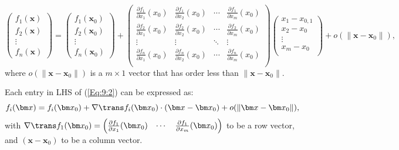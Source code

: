 \begin{equation}\label{Eq:9:2}
\begin{pmatrix}
f_1(\bm x)\\
f_2(\bm x)\\
\vdots\\
f_n(\bm x)
\end{pmatrix}=
\begin{pmatrix}
f_1(\bm x_0)\\
f_2(\bm x_0)\\
\vdots\\
f_n(\bm x_0)
\end{pmatrix}
+
\begin{pmatrix}
\frac{\partial f_1}{\partial x_1}(x_0)&\frac{\partial f_1}{\partial x_2}(x_0)&\cdots&\frac{\partial f_1}{\partial x_m}(x_0)\\
\frac{\partial f_2}{\partial x_1}(x_0)&\frac{\partial f_2}{\partial x_2}(x_0)&\cdots&\frac{\partial f_2}{\partial x_m}(x_0)\\
\vdots&\vdots&\ddots&\vdots\\
\frac{\partial f_n}{\partial x_1}(x_0)&\frac{\partial f_n}{\partial x_2}(x_0)&\cdots&\frac{\partial f_n}{\partial x_m}(x_0)\\
\end{pmatrix}
\begin{pmatrix}
x_1- x_{0,1}\\
x_2- x_0\\
\vdots\\
x_m- x_0\\
\end{pmatrix}
+o(\|\bm x-\bm x_0\|),
\end{equation}
where $o(\|\bm x-\bm x_0\|)$ is a $m\times 1$ vector that has order less than $\|\bm x-\bm x_0\|$.

Each entry in LHS of (\ref{Eq:9:2}) can be expressed as:
\[
f_i(\bm x)=f_i(\bm x_0)+\nabla\trans f_i(\bm x_0)\cdot (\bm x-\bm x_0)+o(\|\bm x-\bm x_0\|),
\]
with $\nabla\trans f_1(\bm x_0) = \begin{pmatrix}
\frac{\partial f_1}{\partial x_1}(\bm x_0)
&
\cdots
&
\frac{\partial f_1}{\partial x_m}(\bm x_0)
\end{pmatrix}$ to be a row vector, and $(\bm x-\bm x_0)$ to be a column vector.

